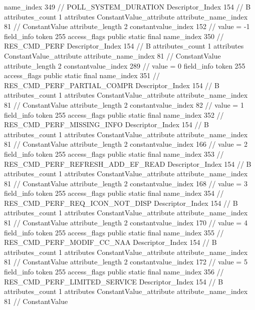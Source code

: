 {{{{{				name_index	349		// POLL_SYSTEM_DURATION
				Descriptor_Index	154		// B
				attributes_count	1
				attributes {
				ConstantValue_attribute {
					attribute_name_index	81		// ConstantValue
					attribute_length	2
					constantvalue_index	152		// value = -1
				}
				}
			}
			field_info {
				token	255
				access_flags	public static final
				name_index	350		// RES_CMD_PERF
				Descriptor_Index	154		// B
				attributes_count	1
				attributes {
				ConstantValue_attribute {
					attribute_name_index	81		// ConstantValue
					attribute_length	2
					constantvalue_index	289		// value = 0
				}
				}
			}
			field_info {
				token	255
				access_flags	public static final
				name_index	351		// RES_CMD_PERF_PARTIAL_COMPR
				Descriptor_Index	154		// B
				attributes_count	1
				attributes {
				ConstantValue_attribute {
					attribute_name_index	81		// ConstantValue
					attribute_length	2
					constantvalue_index	82		// value = 1
				}
				}
			}
			field_info {
				token	255
				access_flags	public static final
				name_index	352		// RES_CMD_PERF_MISSING_INFO
				Descriptor_Index	154		// B
				attributes_count	1
				attributes {
				ConstantValue_attribute {
					attribute_name_index	81		// ConstantValue
					attribute_length	2
					constantvalue_index	166		// value = 2
				}
				}
			}
			field_info {
				token	255
				access_flags	public static final
				name_index	353		// RES_CMD_PERF_REFRESH_ADD_EF_READ
				Descriptor_Index	154		// B
				attributes_count	1
				attributes {
				ConstantValue_attribute {
					attribute_name_index	81		// ConstantValue
					attribute_length	2
					constantvalue_index	168		// value = 3
				}
				}
			}
			field_info {
				token	255
				access_flags	public static final
				name_index	354		// RES_CMD_PERF_REQ_ICON_NOT_DISP
				Descriptor_Index	154		// B
				attributes_count	1
				attributes {
				ConstantValue_attribute {
					attribute_name_index	81		// ConstantValue
					attribute_length	2
					constantvalue_index	170		// value = 4
				}
				}
			}
			field_info {
				token	255
				access_flags	public static final
				name_index	355		// RES_CMD_PERF_MODIF_CC_NAA
				Descriptor_Index	154		// B
				attributes_count	1
				attributes {
				ConstantValue_attribute {
					attribute_name_index	81		// ConstantValue
					attribute_length	2
					constantvalue_index	172		// value = 5
				}
				}
			}
			field_info {
				token	255
				access_flags	public static final
				name_index	356		// RES_CMD_PERF_LIMITED_SERVICE
				Descriptor_Index	154		// B
				attributes_count	1
				attributes {
				ConstantValue_attribute {
					attribute_name_index	81		// ConstantValue
}}}}}}}
